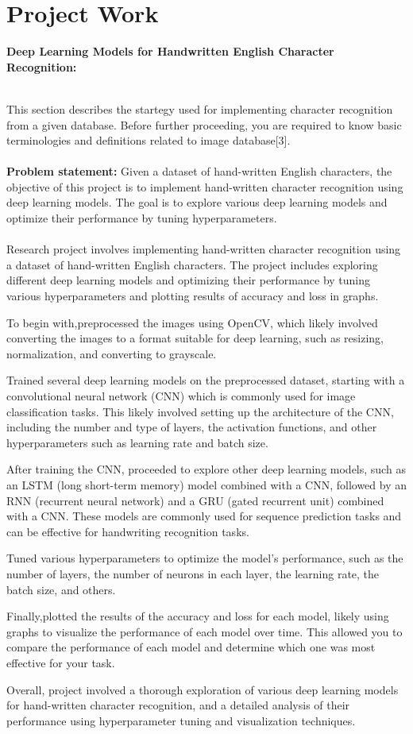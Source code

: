 \chapter{Project Work}\label{final}

\textbf{\large Deep Learning Models for Handwritten
English Character Recognition:}

\\This section describes the startegy used for implementing character recognition from a given database. Before further proceeding, you are required
to know basic terminologies and definitions related to image database[3].\\\\
\textbf{Problem statement:} Given a dataset of hand-written English characters, the objective of this project is to implement hand-written character recognition using deep learning models. The goal is to explore various deep learning models and optimize their performance by tuning hyperparameters.\\\\

Research project involves implementing hand-written character recognition using a dataset of hand-written English characters. The project includes exploring different deep learning models and optimizing their performance by tuning various hyperparameters and plotting results of accuracy and loss in graphs.


To begin with,preprocessed the images using OpenCV, which likely involved converting the images to a format suitable for deep learning, such as resizing, normalization, and converting to grayscale.

Trained several deep learning models on the preprocessed dataset, starting with a convolutional neural network (CNN) which is commonly used for image classification tasks. This likely involved setting up the architecture of the CNN, including the number and type of layers, the activation functions, and other hyperparameters such as learning rate and batch size.

After training the CNN, proceeded to explore other deep learning models, such as an LSTM (long short-term memory) model combined with a CNN, followed by an RNN (recurrent neural network) and a GRU (gated recurrent unit) combined with a CNN. These models are commonly used for sequence prediction tasks and can be effective for handwriting recognition tasks.

Tuned various hyperparameters to optimize the model's performance, such as the number of layers, the number of neurons in each layer, the learning rate, the batch size, and others.

Finally,plotted the results of the accuracy and loss for each model, likely using graphs to visualize the performance of each model over time. This allowed you to compare the performance of each model and determine which one was most effective for your task.

Overall, project involved a thorough exploration of various deep learning models for hand-written character recognition, and a detailed analysis of their performance using hyperparameter tuning and visualization techniques.
 

